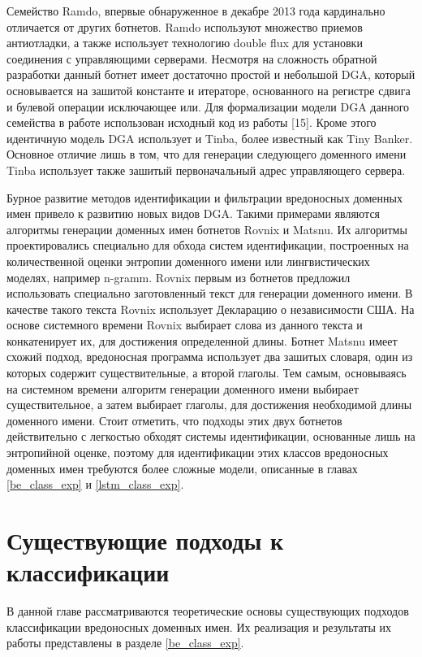 Семейство Ramdo, впервые обнаруженное в декабре 2013 года кардинально отличается от других ботнетов. Ramdo используют множество приемов антиотладки, а также использует технологию double flux для установки соединения с управляющими серверами. Несмотря на сложность обратной разработки данный ботнет имеет достаточно простой и небольшой DGA, который основывается на зашитой константе и итераторе, основанного на регистре сдвига и булевой операции исключающее или. Для формализации модели DGA данного семейства в работе использован исходный код из работы [15]. Кроме этого идентичную модель DGA использует и Tinba, более известный как Tiny Banker. Основное отличие лишь в том, что для генерации следующего доменного имени Tinba использует также зашитый первоначальный адрес управляющего сервера.

Бурное развитие методов идентификации и фильтрации вредоносных доменных имен привело к развитию новых видов DGA. Такими примерами являются алгоритмы генерации доменных имен ботнетов Rovnix и Matsnu. Их алгоритмы проектировались специально для обхода систем идентификации, построенных на количественной оценки энтропии доменного имени или лингвистических моделях, например n-gramm. Rovnix первым из ботнетов предложил использовать специально заготовленный текст для генерации доменного имени. В качестве такого текста Rovnix использует Декларацию о независимости США. На основе системного времени Rovnix выбирает слова из данного текста и конкатенирует их, для достижения определенной длины. Ботнет Matsnu имеет схожий подход, вредоносная программа использует два зашитых словаря, один из которых содержит существительные, а второй глаголы. Тем самым, основываясь на системном времени алгоритм генерации доменного имени выбирает существительное, а затем выбирает глаголы, для достижения необходимой длины доменного имени. Стоит отметить, что подходы этих двух ботнетов действительно с легкостью обходят системы идентификации, основанные лишь на энтропийной оценке, поэтому для идентификации этих классов вредоносных доменных имен требуются более сложные модели, описанные в главах \ref{be_class_exp} и \ref{lstm_class_exp}.
\clearpage

\section{Существующие подходы к классификации}\label{be_class}
В данной главе рассматриваются теоретические основы существующих подходов классификации вредоносных доменных имен. Их реализация и результаты их работы представлены в разделе \ref{be_class_exp}.

